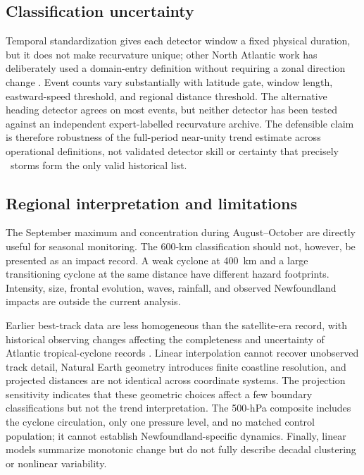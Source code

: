 \documentclass[11pt]{article}
\begin{document}
\subsection{Classification uncertainty}
Temporal standardization gives each detector window a fixed physical duration, but it does not make recurvature unique; other North Atlantic work has deliberately used a domain-entry definition without requiring a zonal direction change \citep{Sainsbury2022}. Event counts vary substantially with latitude gate, window length, eastward-speed threshold, and regional distance threshold. The alternative heading detector agrees on most events, but neither detector has been tested against an independent expert-labelled recurvature archive. The defensible claim is therefore robustness of the full-period near-unity trend estimate across operational definitions, not validated detector skill or certainty that precisely \BaselineN\ storms form the only valid historical list.

\subsection{Regional interpretation and limitations}
The September maximum and concentration during August--October are directly useful for seasonal monitoring. The 600-km classification should not, however, be presented as an impact record. A weak cyclone at 400~km and a large transitioning cyclone at the same distance have different hazard footprints. Intensity, size, frontal evolution, waves, rainfall, and observed Newfoundland impacts are outside the current analysis.

Earlier best-track data are less homogeneous than the satellite-era record, with historical observing changes affecting the completeness and uncertainty of Atlantic tropical-cyclone records \citep{VecchiKnutson2008,LandseaFranklin2013}. Linear interpolation cannot recover unobserved track detail, Natural Earth geometry introduces finite coastline resolution, and projected distances are not identical across coordinate systems. The projection sensitivity indicates that these geometric choices affect a few boundary classifications but not the trend interpretation. The 500-hPa composite includes the cyclone circulation, only one pressure level, and no matched control population; it cannot establish Newfoundland-specific dynamics. Finally, linear models summarize monotonic change but do not fully describe decadal clustering or nonlinear variability.
\end{document}
